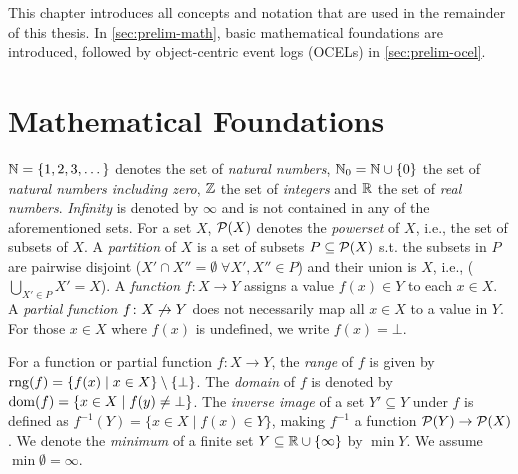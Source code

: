 This chapter introduces all concepts and notation that are used in the remainder of this thesis.
In \autoref{sec:prelim-math}, basic mathematical foundations are introduced,
followed by object-centric event logs (OCELs) in \autoref{sec:prelim-ocel}.

\section{Mathematical Foundations}
\label{sec:prelim-math}

\begin{outline}
  \1 $\mathbb{N} = \{1, 2, 3, \dots\}$ denotes the set of \textit{natural numbers}, $\mathbb{N}_0=\mathbb{N}\cup\{0\}$ the set of \textit{natural numbers including zero}, $\mathbb{Z}$ the set of \textit{integers} and $\mathbb{R}$ the set of \textit{real numbers}. \textit{Infinity} is denoted by $\infty$ and is not contained in any of the aforementioned sets.
  \1 For a set $X$, $\mathcal{P}(X)$ denotes the \textit{powerset} of $X$, i.e., the set of subsets of $X$.
  A \textit{partition} of $X$ is a set of subsets $P\subseteq\mathcal{P}(X)$ s.t. the subsets in $P$ are pairwise disjoint ($X' {\cap} X'' = \emptyset\;\forall X',X''\in P$) and their union is $X$, i.e., ($\bigcup_{X'\in P} X' = X$).
  \1 A \textit{function} $f\colon X \to Y$ assigns a value $f(x)\in Y$ to each $x\in X$.
  A \textit{partial function} $f\colon X \not\to Y$ does not necessarily map all $x\in X$ to a value in $Y$.
  For those $x\in X$ where $f(x)$ is undefined, we write $f(x)=\bot$.
  
  For a function or partial function $f\colon X\to Y$,
  the \textit{range} of $f$ is given by $\operatorname{rng}(f)=\{f(x)\mid x\in X\}\setminus\{\bot\}$.
  The \textit{domain} of $f$ is denoted by $\operatorname{dom}(f)=\{x\in X \mid f(y)\neq\bot\}$.
  The \textit{inverse image} of a set $Y'\subseteq Y$ under $f$ is defined as
  $f^{-1}(Y) = \{ x\in X \mid f(x) \in Y \}$,
  making $f^{-1}$ a function $\mathcal{P}(Y)\to\mathcal{P}(X)$.
  \1 We denote the \textit{minimum}
  of a finite set $Y\subseteq\mathbb{R}\cup\{\infty\}$
  by $\min Y$.
  We assume $\min\emptyset=\infty$.


\end{outline}
